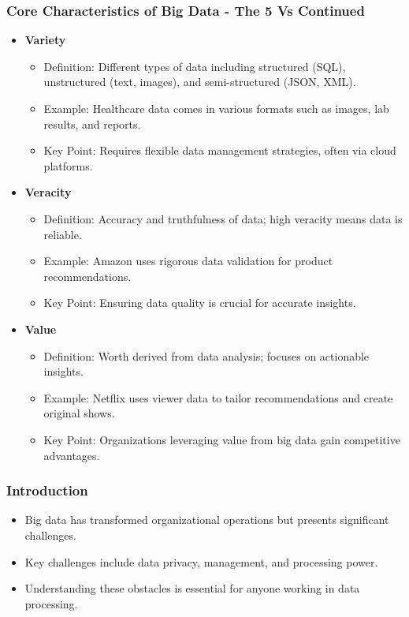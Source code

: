 \documentclass[aspectratio=169]{beamer}
\begin{document}
\begin{frame}[fragile]
    \frametitle{Core Characteristics of Big Data - The 5 Vs Continued}
    \begin{itemize}
        \item \textbf{Variety}
        \begin{itemize}
            \item Definition: Different types of data including structured (SQL), unstructured (text, images), and semi-structured (JSON, XML).
            \item Example: Healthcare data comes in various formats such as images, lab results, and reports.
            \item Key Point: Requires flexible data management strategies, often via cloud platforms.
        \end{itemize}
        
        \item \textbf{Veracity}
        \begin{itemize}
            \item Definition: Accuracy and truthfulness of data; high veracity means data is reliable.
            \item Example: Amazon uses rigorous data validation for product recommendations.
            \item Key Point: Ensuring data quality is crucial for accurate insights.
        \end{itemize}
        
        \item \textbf{Value}
        \begin{itemize}
            \item Definition: Worth derived from data analysis; focuses on actionable insights.
            \item Example: Netflix uses viewer data to tailor recommendations and create original shows.
            \item Key Point: Organizations leveraging value from big data gain competitive advantages.
        \end{itemize}
    \end{itemize}
\end{frame}

\begin{frame}[fragile]
  \frametitle{Introduction}
  \begin{itemize}
    \item Big data has transformed organizational operations but presents significant challenges.
    \item Key challenges include data privacy, management, and processing power.
    \item Understanding these obstacles is essential for anyone working in data processing.
  \end{itemize}
\end{frame}
\end{document}
